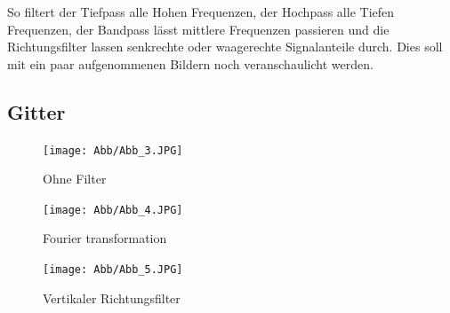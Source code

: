 So filtert der Tiefpass alle Hohen Frequenzen, der Hochpass alle Tiefen Frequenzen, der Bandpass lässt mittlere Frequenzen passieren und die Richtungsfilter lassen senkrechte oder waagerechte Signalanteile durch.
Dies soll mit ein paar aufgenommenen Bildern noch veranschaulicht werden.
        \subsection*{Gitter}
            \begin{figure}[H]
                  \begin{minipage}{0.33\textwidth}
                   \centering
                    \texttt{[image: Abb/Abb\_3.JPG]}
                    \caption{Ohne Filter}
                  \end{minipage}\hfill
                  \begin{minipage}{0.33\textwidth}
                   \centering
                    \texttt{[image: Abb/Abb\_4.JPG]}
                    \caption{Fourier transformation}
                  \end{minipage}\hfill
                  \begin{minipage}{0.33\textwidth}
                   \centering
                    \texttt{[image: Abb/Abb\_5.JPG]}
                    \caption{Vertikaler Richtungsfilter}
                  \end{minipage}
            \end{figure}


